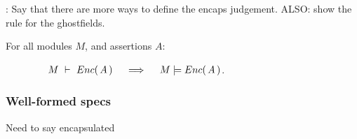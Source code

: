 %
%
%

{: Say that there are more ways to define the encaps judgement. ALSO: show the rule for the ghostfields. }

\begin{lemma}
\label{lem:encap-soundness}
For all modules $M$, and assertions $A$: 

$\strut \hspace{1.5cm} \proves{M}{\encaps{A}} \ \ \ \ \Longrightarrow\ \ \ \ \satisfies{M}{\encaps{A}}$.
\end{lemma}


 \subsubsection{Well-formed specs}
{ } Need to say encapsulated 

